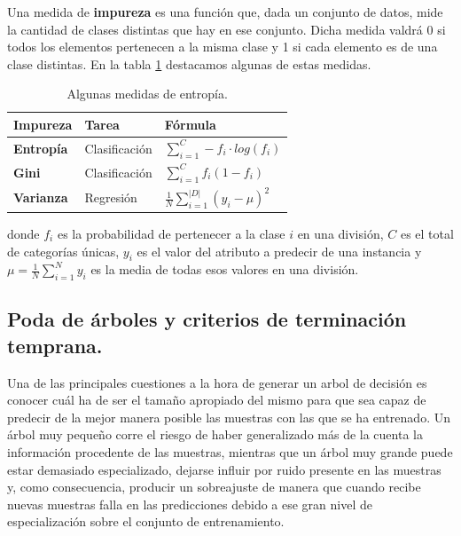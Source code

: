 Una medida de \textbf{impureza} \cite{impurity} es una función que, dada un conjunto de datos, mide la cantidad de clases distintas que hay en ese conjunto. Dicha medida valdrá 0 si todos los elementos pertenecen a la misma clase y 1 si cada elemento es de una clase distintas. En la tabla \ref{tab:entropy} destacamos algunas de estas medidas.\\

\begin{table}[ht]
\centering
\begin{tabular}{|l|l|l|}
\hline
\textbf{Impureza} & \textbf{Tarea} & \textbf{Fórmula}                         \\ \hline
\textbf{Entropía}  & Clasificación  & $\sum_{i=1}^{C}- f_i \cdot log (f_i)$    \\ \hline
\textbf{Gini}      & Clasificación  & $\sum_{i=1}^{C} f_i (1 - f_i)$           \\ \hline
\textbf{Varianza}  & Regresión      & $\frac{1}{N}\sum_{i=1}^|D|(y_i - \mu)^2$ \\ \hline
\end{tabular}
\caption{Algunas medidas de entropía.}
\label{tab:entropy}
\end{table}

donde $f_i$ es la probabilidad de pertenecer a la clase $i$ en una división, $C$ es el total de categorías únicas, $y_i$ es el valor del atributo a predecir de una instancia  y $\mu = \frac{1}{N} \sum_{i=1}^{N}y_i$ es la media de todas esos valores en una división.\\

\subsection{Poda de árboles y criterios de terminación temprana.}
Una de las principales cuestiones a la hora de generar un arbol de decisión es conocer cuál ha de ser el tamaño apropiado del mismo para que sea capaz de predecir de la mejor manera posible las muestras con las que se ha entrenado. Un árbol muy pequeño corre el riesgo de haber generalizado más de la cuenta la información procedente de las muestras, mientras que un árbol muy grande puede estar demasiado especializado, dejarse influir por ruido presente en las muestras y, como consecuencia, producir un sobreajuste de manera que cuando recibe nuevas muestras falla en las predicciones debido a ese gran nivel de especialización sobre el conjunto de entrenamiento. \\

